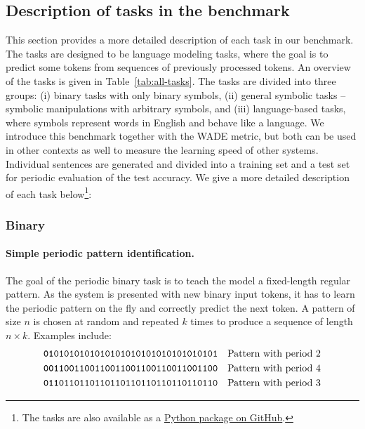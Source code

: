 \subsection{Description of tasks in the benchmark\label{sec:descr-tasks-benchm}}

This section provides a more detailed description of each task in our benchmark.
The tasks are designed to be language modeling tasks, where the goal is to
predict some tokens from sequences of previously processed tokens. An overview
of the tasks is given in Table~\ref{tab:all-tasks}. The tasks are divided into three
groups: (i) binary tasks with only binary symbols, (ii) general symbolic tasks
-- symbolic manipulations with arbitrary symbols, and (iii) language-based tasks, where symbols represent words in English and behave like a language. We introduce
this benchmark together with the WADE metric, but both can be used in other
contexts as well to measure the learning speed of other systems. Individual
sentences are generated and divided into a training set and a test set for
periodic evaluation of the test accuracy. We give a more detailed description of
each task below\footnote{The tasks are also available as a
  \href{https://github.com/hugcis/incremental_tasks}{Python package on GitHub}.}:

\subsubsection{Binary}
\paragraph{Simple periodic pattern identification.}

The goal of the periodic binary task is to teach the model a fixed-length
regular pattern. As the system is presented with new binary input tokens, it has
to learn the periodic pattern on the fly and correctly predict the next token. A
pattern of size $n$ is chosen at random and repeated $k$ times to produce a
sequence of length $n \times k$. Examples include:
\begin{align*}
  \begin{split}
  \textbf{\texttt{01}}\texttt{01010101010101010101010101010101} & \quad\text{Pattern with period 2}\\
  \texttt{\textbf{0011}001100110011001100110011001100} & \quad\text{Pattern with period 4}\\
  \texttt{\textbf{011}0110110110110110110110110110110} & \quad\text{Pattern with period 3}
\end{split}\label{eq:1}
\end{align*}

